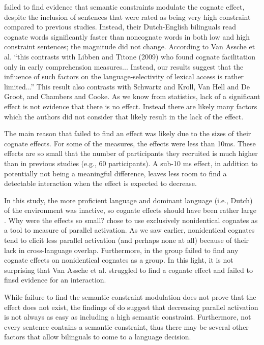 \textcite{VanAssche2010} failed to find evidence that semantic constraints modulate the cognate effect, despite the inclusion of  sentences that were rated as being very high constraint compared to previous studies. Instead, their Dutch-English bilinguals read cognate words significantly faster than noncognate words in both low and high constraint sentences; the magnitude did not change. According to Van Assche et al. ``this contrasts with Libben and Titone (2009) who found cognate facilitation only in early comprehension measures... Instead, our results suggest that the influence of such factors on the language-selectivity of lexical access is rather limited...'' This result also contrasts with Schwartz and Kroll, Van Hell and De Groot, and Chambers and Cooke. As we know from statistics, lack of a significant effect is not evidence that there is no effect. Instead there are likely many factors which the authors did not consider that likely result in the lack of the effect.  

The main reason that \textcite{VanAssche2010} failed to find an effect was likely due to the sizes of their cognate effects. For some of the measures, the effects were less than 10ms. These effects are so small that the number of participants they recruited is much higher than in previous studies (e.g., 60 participants). A sub-10 ms effect, in  addition to potentially not being a meaningful difference, leaves less room to find a detectable interaction when the effect is expected to decrease.

In this study, the more proficient language and dominant language (i.e., Dutch) of the environment was inactive, so cognate effects should have been rather large \parencite[e.g.,][]{Jared2001, Marian2003, VanHell2002}. Why were the effects so small?  \textcite{VanAssche2010} chose to use exclusively nonidentical cognates as a tool to measure of parallel activation. As we saw earlier, nonidentical cognates tend to elicit less parallel activation (and perhaps none at all) because of their lack in cross-language overlap. Furthermore, in \textcite{Duyck2007} the group failed to find any cognate effects on nonidentical cognates as a group. In this light, it is not surprising that Van Assche et al. struggled to find a cognate effect and failed to finsd evidence for an interaction. 

While failure to find the semantic constraint modulation does not prove that the effect does not exist, the findings of \textcite{VanAssche2010} do suggest that decreasing parallel activation is not always as easy as including a high semantic constraint. Furthermore, not every sentence contains a semantic constraint, thus there may be several other factors that allow bilinguals to come to a language decision. 

